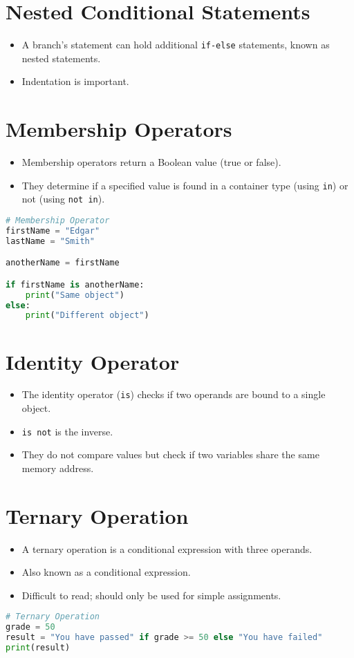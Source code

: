 \documentclass{article}
\begin{document}
\section{Nested Conditional Statements}
\begin{itemize}
    \item A branch’s statement can hold additional \texttt{if-else} statements, known as nested statements.
    \item Indentation is important.
\end{itemize}

\section{Membership Operators}
\begin{itemize}
    \item Membership operators return a Boolean value (true or false).
    \item They determine if a specified value is found in a container type (using \texttt{in}) or not (using \texttt{not in}).
\end{itemize}
\begin{lstlisting}[language=python]
# Membership Operator
firstName = "Edgar"
lastName = "Smith"

anotherName = firstName

if firstName is anotherName:
    print("Same object")
else:
    print("Different object")     
\end{lstlisting}
\section{Identity Operator}
\begin{itemize}
    \item The identity operator (\texttt{is}) checks if two operands are bound to a single object.
    \item \texttt{is not} is the inverse.
    \item They do not compare values but check if two variables share the same memory address.
\end{itemize}

\section{Ternary Operation}
\begin{itemize}
    \item A ternary operation is a conditional expression with three operands.
    \item Also known as a conditional expression.
    \item Difficult to read; should only be used for simple assignments.
\end{itemize}

\begin{lstlisting}[language=Python]
# Ternary Operation
grade = 50
result = "You have passed" if grade >= 50 else "You have failed"
print(result)
\end{lstlisting}
\end{document}

